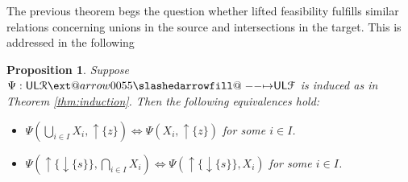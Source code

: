 \documentclass[12pt]{article}
\makeatletter
\theoremstyle{definition}
\theoremstyle{plain}
\theoremstyle{plain}
\newtheorem{proposition}[definition]{Proposition}
\theoremstyle{plain}
\theoremstyle{plain}
\theoremstyle{remark}
\theoremstyle{remark}
\newcommand{\mc}[1]{\mathcal{#1}}
\newcommand{\low}{\mathsf{L}}
\newcommand{\upper}{\mathsf{U}}
\newcommand{\upc}[1]{{\uparrow #1}}
\newcommand{\lwc}[1]{{\downarrow #1}}
\def\slashedarrowfill@#1#2#3#4#5{%
	$\m@th\thickmuskip0mu\medmuskip\thickmuskip\thinmuskip\thickmuskip
	\relax#5#1\mkern-7mu%
	\cleaders\hbox{$#5\mkern-2mu#2\mkern-2mu$}\hfill
	\mathclap{#3}\mathclap{#2}%
	\cleaders\hbox{$#5\mkern-2mu#2\mkern-2mu$}\hfill
	\mkern-7mu#4$%
}
\def\rightslashedarrowfill@{%
	\slashedarrowfill@\relbar\relbar\mapstochar\rightarrow}
\newcommand\xslashedrightarrow[2][]{%
	\ext@arrow 0055{\rightslashedarrowfill@}{#1}{#2}}
\makeatother
\begin{document}
\newpage
The previous theorem begs the question whether lifted feasibility fulfills similar relations concerning unions in the source and intersections in the target. This is addressed in the following
\begin{proposition}\label{prop:union intersection}
	Suppose $\Psi: \upper\low\mc{R} \xslashedrightarrow{} \upper\low\mc{F}$ is induced as in Theorem \ref{thm:induction}. Then the following equivalences hold: 
	\begin{itemize}
		\item[(i)] $\Psi(\bigcup_{i \in I} X_i, \upc{\{z\}}) \Leftrightarrow \Psi(X_i,\upc{\{z\}})$ for some $i \in I$.
		\item[(ii)] $\Psi(\upc{\{\lwc{\{s\}}\}}, \bigcap_{i \in I}X_i) \Leftrightarrow \Psi(\upc{\{\lwc{\{s\}}\}},X_i)$ for some $i \in I$.
	\end{itemize}
\end{proposition}
\end{document}

